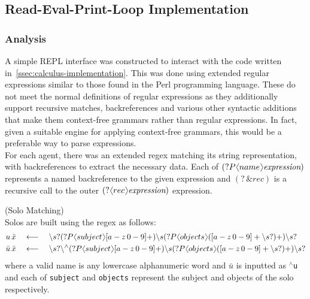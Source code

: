 \subsection{Read-Eval-Print-Loop Implementation}
    \subsubsection{Analysis}
        A simple REPL interface was constructed to interact with the code written in~\ref{ssec:calculus-implementation}.
        This was done using extended regular expressions similar to those found in the Perl programming language.
        These do not meet the normal definitions of regular expressions as they additionally support recursive matches, backreferences and various other syntactic additions that make them context-free grammars rather than regular expressions.
        In fact, given a suitable engine for applying context-free grammars, this would be a preferable way to parse expressions. \\

        For each agent, there was an extended regex matching its string representation, with backreferences to extract the necessary data.
        Each of $(?P\langl name \rangl \textit{expression})$ represents a named backreference to the given expression and $(? \, \& rec)$ is a recursive call to the outer $(?\langl rec \rangl \textit{expression})$ expression.
        
        \begin{definition}{(Solo Matching)\\}
            Solos are built using the regex as follows:
            \begin{align*}
                u \, \tilde{x}       & \quad \longleftarrow \quad \backslash s? (?P \langl subject \rangl [a-z \, 0-9]+) \backslash s (?P \langl objects \rangl ([a-z \, 0-9]+ \backslash s?)+) \backslash s? \\
                \bar{u} \, \tilde{x} & \quad \longleftarrow \quad \backslash s? \backslash ^{\wedge} (?P \langl subject \rangl [a-z \, 0-9]+) \backslash s (?P \langl objects \rangl ([a-z \, 0-9]+ \backslash s?)+) \backslash s?
            \end{align*}
            where a valid name is any lowercase alphanumeric word and $\bar{u}$ is inputted as \texttt{$^{\wedge}$u} and each of \texttt{subject} and \texttt{objects} represent the subject and objects of the solo respectively.
        \end{definition}

